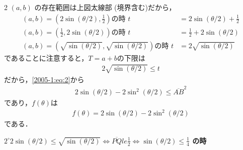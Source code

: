 \documentclass[../../../../main.tex]{subfiles}
\begin{document}
\begin{multicols}{2}
    $(a,b)$ の存在範囲は上図太線部 (境界含む)だから，
    \begin{align*}
        (a,b)=(2\sin(\theta/2), \frac{1}{2})\text{の時 } t                 & =2\sin(\theta/2)+\frac{1}{2} \\
        (a,b)=(\frac{1}{2}, 2\sin(\theta/2))\text{の時 } t                 & =\frac{1}{2}+2\sin(\theta/2) \\
        (a,b)=(\sqrt{\sin(\theta/2)}, \sqrt{\sin(\theta/2)})\text{の時 } t & =2\sqrt{\sin(\theta/2)}
    \end{align*}
    であることに注意すると，$T=a+b$の下限は
    \begin{align*}
        2\sqrt{\sin(\theta/2)} \le t
    \end{align*}
    だから，\cref{2005-1:eq:2}から
    \begin{align*}
        2\sin\left(\theta/2\right) - 2\sin^2\left(\theta/2\right) \le \overline{AB}^2
    \end{align*}
    であり，$f(\theta)$は
    \begin{align}
        f(\theta) = 2\sin\left(\theta/2\right) - 2\sin^2\left(\theta/2\right) \label{2005-1:eq:3}
    \end{align}
    である．



    \noindent
    \textbf{$2^\circ 2\sin(\theta/2) \le \sqrt{\sin(\theta/2)} \iff \overline{PQ} le \frac{1}{2} \iff \sin(\theta/2) \le \frac{1}{4}$ の時}

    \begin{figure}[H]
        \centering
\end{figure}
\end{multicols}
\end{document}

